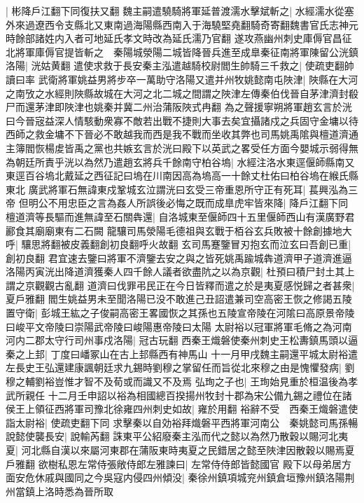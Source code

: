 |{
	彬降戶江翻下同復扶又翻}
魏主嗣遣驍騎將軍延普渡濡水擊斌斬之|{
	水經濡水從塞外來過遼西令支縣北又東南過海陽縣西南入于海驍堅堯翻騎奇寄翻魏書官氏志神元時餘部諸姓内入者可地延氏孝文時改為延氏濡乃官翻}
遂攻燕幽州刺史庫傉官昌征北將軍庫傉官提皆斬之　秦陽城滎陽二城皆降晉兵進至成臯秦征南將軍陳留公洸鎮洛陽|{
	洸姑黄翻}
遣使求救于長安秦主泓遣越騎校尉閻生帥騎三千救之|{
	使疏吏翻帥讀曰率}
武衛將軍姚益男將步卒一萬助守洛陽又遣并州牧姚懿南屯陜津|{
	陜縣在大河之南攷之水經則陜縣故城在大河之北二城之間謂之陜津左傳秦伯伐晉自茅津濟封殽尸而還茅津即陜津也姚秦并冀二州治蒲阪陜式冉翻}
為之聲援寧朔將軍趙玄言於洸曰今晉宼益深人情駭動衆寡不敵若出戰不捷則大事去矣宜攝諸戍之兵固守金墉以待西師之救金墉不下晉必不敢越我而西是我不戰而坐收其弊也司馬姚禹隂與檀道濟通主簿閻恢楊䖍皆禹之黨也共嫉玄言於洸曰殿下以英武之畧受任方面今嬰城示弱得無為朝廷所責乎洸以為然乃遣趙玄將兵千餘南守柏谷塢|{
	水經注洛水東逕偃師縣南又東逕百谷塢北戴延之西征記曰塢在川南因高為塢高一十餘丈杜佑曰柏谷塢在緱氏縣東北}
廣武將軍石無諱東戍鞏城玄泣謂洸曰玄受三帝重恩所守正有死耳|{
	萇興泓為三帝}
但明公不用忠臣之言為姦人所誤後必悔之既而成臯虎牢皆來降|{
	降戶江翻下同}
檀道濟等長驅而進無諱至石關犇還|{
	自洛城東至偃師四十五里偃師西山有漢廣野君酈食其廟廟東有二石闕}
龍驤司馬滎陽毛德祖與玄戰于栢谷玄兵敗被十餘創據地大呼|{
	驤思將翻被皮義翻創初良翻呼火故翻}
玄司馬蹇鑒冒刃抱玄而泣玄曰吾創已重|{
	創初良翻}
君宜速去鑒曰將軍不濟鑒去安之與之皆死姚禹踰城犇道濟甲子道濟進逼洛陽丙寅洸出降道濟獲秦人四千餘人議者欲盡阬之以為京觀|{
	杜預曰積尸封土其上謂之京觀觀古亂翻}
道濟曰伐罪弔民正在今日皆釋而遣之於是夷夏感悦歸之者甚衆|{
	夏戶雅翻}
閻生姚益男未至聞洛陽已没不敢進己丑詔遣兼司空高密王恢之修謁五陵置守衛|{
	彭城王紘之子俊嗣高密王畧國恢之其孫也五陵宣帝陵在河隂曰高原景帝陵曰峻平文帝陵曰崇陽武帝陵曰峻陽惠帝陵曰太陽}
太尉裕以冠軍將軍毛脩之為河南河内二郡太守行司州事戍洛陽|{
	冠古玩翻}
西秦王熾磐使秦州刺史王松夀鎮馬頭以逼秦之上邽|{
	丁度曰嶓冢山在古上邽縣西有神馬山}
十一月甲戌魏主嗣還平城太尉裕遣左長史王弘還建康諷朝廷求九錫時劉穆之掌留任而旨從北來穆之由是愧懼發病|{
	劉穆之輔劉裕豈惟才智不及荀或而識又不及焉}
弘珣之子也|{
	王珣始見重於桓温後為孝武所親任}
十二月壬申詔以裕為相國總百揆揚州牧封十郡為宋公備九錫之禮位在諸侯王上領征西將軍司豫北徐雍四州刺史如故|{
	雍於用翻}
裕辭不受　西秦王熾磐遣使詣太尉裕|{
	使疏吏翻下同}
求擊秦以自効裕拜熾磐平西將軍河南公　秦姚懿司馬孫暢說懿使襲長安|{
	說輸芮翻}
誅東平公紹廢秦主泓而代之懿以為然乃散穀以賜河北夷夏|{
	河北縣自漢以來屬河東郡在蒲阪東時夷夏之民錯居之懿至陜津因散穀以賜焉夏戶雅翻}
欲樹私恩左常侍張敞侍郎左雅諫曰|{
	左常侍侍郎皆懿國官}
殿下以母弟居方面安危休戚與國同之今吳寇内侵四州傾没|{
	秦徐州鎮項城兖州鎮倉垣豫州鎮洛陽荆州當鎮上洛時悉為晉所取}
